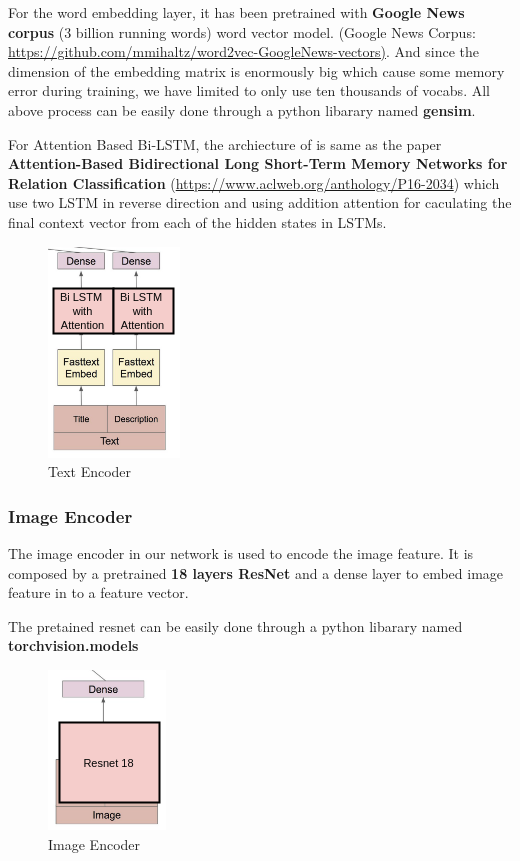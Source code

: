 \documentclass{article}
\begin{document}
For the word embedding layer, it has been pretrained with \textbf{Google News corpus} (3 billion running words) word vector model. (Google News Corpus: \url{https://github.com/mmihaltz/word2vec-GoogleNews-vectors)}. And since the dimension of the embedding matrix is enormously big which cause some memory error during training, we have limited to only use ten thousands of vocabs. All above process can be easily done through a python libarary named \textbf{gensim}.

For Attention Based Bi-LSTM, the archiecture of is same as the paper \textbf{Attention-Based Bidirectional Long Short-Term Memory Networks for Relation Classification} (\url{https://www.aclweb.org/anthology/P16-2034}) which use two LSTM in reverse direction and using addition attention for caculating the final context vector from each of the hidden states in LSTMs.

\begin{figure}[h]
  \centering
  \includegraphics[scale=1]{rnn.png}
  \caption{Text Encoder}
\end{figure}

\subsubsection{Image Encoder}

The image encoder in our network is used to encode the image feature. It is composed by a pretrained \textbf{18 layers ResNet} and a dense layer to embed image feature in to a feature vector. 

The pretained resnet can be easily done through a python libarary named \textbf{torchvision.models}

\begin{figure}[h]
  \centering
  \includegraphics[scale=1]{cnn.png}
  \caption{Image Encoder}
\end{figure}
\end{document}
